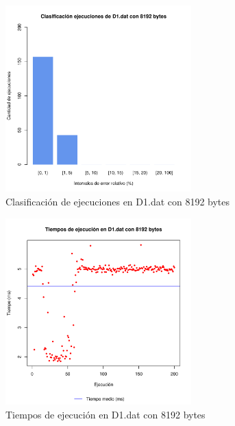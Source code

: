 \begin{figure}[h!]
    \centering
        \includegraphics[width=0.64\textwidth]{../figs/D1/plot_count_8192.pdf}
        \caption{Clasificación de ejecuciones en D1.dat con 8192 bytes}
    \label{figura:D1_count_8192}
\end{figure}

\begin{figure}[h!]
    \centering
        \includegraphics[width=0.64\textwidth]{../figs/D1/plot_time_8192.pdf}
        \caption{Tiempos de ejecución en D1.dat con 8192 bytes}
    \label{figura:D1_time_8192}
\end{figure}

\clearpage
